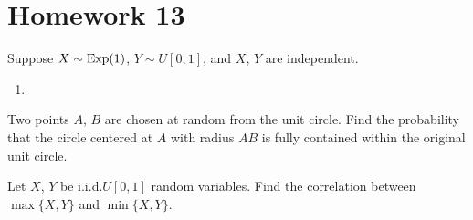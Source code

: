 \section{Homework 13}
\begin{problem}[Handout 17, \# 16]
  Suppose \(X\sim\operatorname{Exp}(1)\), \(Y\sim U[0,1]\), and \(X\), \(Y\) are
  independent.
  \begin{enumerate}[label=(\alph*),noitemsep]
  \item
  \end{enumerate}
\end{problem}
\begin{solution}

\end{solution}

\begin{problem}[Handout 17, \# 18]
  Two points \(A\), \(B\) are chosen at random from the unit circle. Find
  the probability that the circle centered at \(A\) with radius \(AB\) is
  fully contained within the original unit circle.
\end{problem}
\begin{solution}
\end{solution}

\begin{problem}[Handout 17, \# 19]
  Let \(X\), \(Y\) be i.i.d.\@ \(U[0,1]\) random variables. Find the
  correlation between \(\max\{X,Y\}\) and \(\min\{X,Y\}\).
\end{problem}
\begin{solution}
\end{solution}

